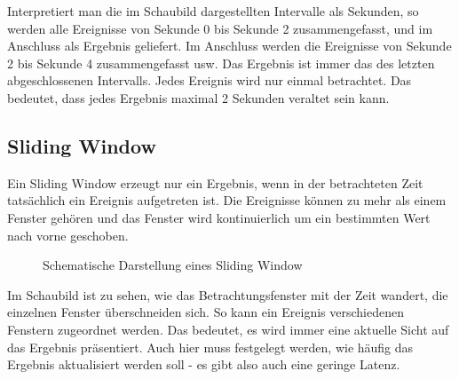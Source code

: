 \documentclass[a4paper,11pt]{scrartcl}
\begin{document}
  Interpretiert man die im Schaubild dargestellten Intervalle als
  Sekunden, so werden alle Ereignisse von Sekunde 0 bis Sekunde 2
  zusammengefasst, und im Anschluss als Ergebnis geliefert. Im
  Anschluss werden die Ereignisse von Sekunde 2 bis Sekunde 4
  zusammengefasst usw. Das Ergebnis ist immer das des letzten
  abgeschlossenen Intervalls. Jedes Ereignis wird nur einmal
  betrachtet. Das bedeutet, dass jedes Ergebnis maximal 2 Sekunden
  veraltet sein kann.

  \subsection{Sliding Window}
  Ein Sliding Window erzeugt nur ein Ergebnis, wenn in der
  betrachteten Zeit tatsächlich ein Ereignis aufgetreten ist. Die
  Ereignisse können zu mehr als einem Fenster gehören und das Fenster
  wird kontinuierlich um ein bestimmten Wert nach vorne geschoben.
  \begin{figure}[!h]
    \centering
    \caption{Schematische Darstellung eines Sliding Window}
  \end{figure}

  Im Schaubild ist zu sehen, wie das Betrachtungsfenster mit der Zeit
  wandert, die einzelnen Fenster überschneiden sich. So kann ein
  Ereignis verschiedenen Fenstern zugeordnet werden. Das bedeutet, es
  wird immer eine aktuelle Sicht auf das Ergebnis präsentiert. Auch
  hier muss festgelegt werden, wie häufig das Ergebnis aktualisiert
  werden soll - es gibt also auch eine geringe Latenz.



\end{document}
